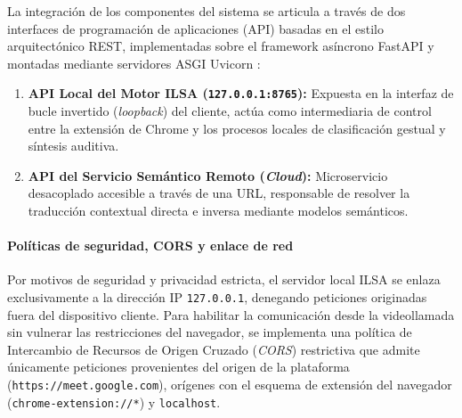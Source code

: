 La integración de los componentes del sistema se articula a través de dos interfaces de programación de aplicaciones (API) basadas en el estilo arquitectónico REST, implementadas sobre el framework asíncrono FastAPI y montadas mediante servidores ASGI Uvicorn \parencite{tiangolo2018fastapi}:
\begin{enumerate}
    \item \textbf{API Local del Motor ILSA (\texttt{127.0.0.1:8765}):} Expuesta en la interfaz de bucle invertido (\textit{loopback}) del cliente, actúa como intermediaria de control entre la extensión de Chrome y los procesos locales de clasificación gestual y síntesis auditiva.
    \item \textbf{API del Servicio Semántico Remoto (\textit{Cloud}):} Microservicio desacoplado accesible a través de una URL, responsable de resolver la traducción contextual directa e inversa mediante modelos semánticos.
\end{enumerate}

\paragraph{Políticas de seguridad, CORS y enlace de red}
Por motivos de seguridad y privacidad estricta, el servidor local ILSA se enlaza exclusivamente a la dirección IP \texttt{127.0.0.1}, denegando peticiones originadas fuera del dispositivo cliente. Para habilitar la comunicación desde la videollamada sin vulnerar las restricciones del navegador, se implementa una política de Intercambio de Recursos de Origen Cruzado (\textit{CORS}) restrictiva que admite únicamente peticiones provenientes del origen de la plataforma (\texttt{https://meet.google.com}), orígenes con el esquema de extensión del navegador (\texttt{chrome-extension://*}) y \texttt{localhost}.

